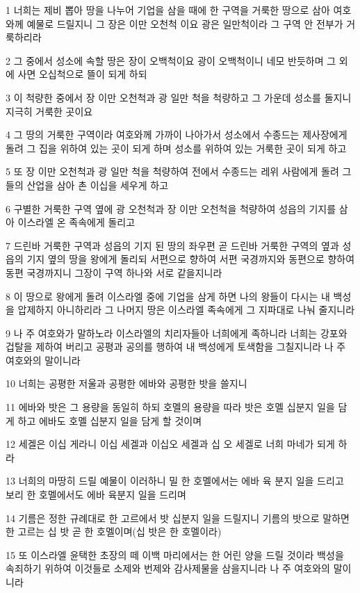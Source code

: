 \par 1 너희는 제비 뽑아 땅을 나누어 기업을 삼을 때에 한 구역을 거룩한 땅으로 삼아 여호와께 예물로 드릴지니 그 장은 이만 오천척 이요 광은 일만척이라 그 구역 안 전부가 거룩하리라
\par 2 그 중에서 성소에 속할 땅은 장이 오백척이요 광이 오백척이니 네모 반듯하며 그 외에 사면 오십척으로 뜰이 되게 하되
\par 3 이 척량한 중에서 장 이만 오천척과 광 일만 척을 척량하고 그 가운데 성소를 둘지니 지극히 거룩한 곳이요
\par 4 그 땅의 거룩한 구역이라 여호와께 가까이 나아가서 성소에서 수종드는 제사장에게 돌려 그 집을 위하여 있는 곳이 되게 하며 성소를 위하여 있는 거룩한 곳이 되게 하고
\par 5 또 장 이만 오천척과 광 일만 척을 척량하여 전에서 수종드는 레위 사람에게 돌려 그들의 산업을 삼아 촌 이십을 세우게 하고
\par 6 구별한 거룩한 구역 옆에 광 오천척과 장 이만 오천척을 척량하여 성읍의 기지를 삼아 이스라엘 온 족속에게 돌리고
\par 7 드린바 거룩한 구역과 성읍의 기지 된 땅의 좌우편 곧 드린바 거룩한 구역의 옆과 성읍의 기지 옆의 땅을 왕에게 돌리되 서편으로 향하여 서편 국경까지와 동편으로 향하여 동편 국경까지니 그장이 구역 하나와 서로 같을지니라
\par 8 이 땅으로 왕에게 돌려 이스라엘 중에 기업을 삼게 하면 나의 왕들이 다시는 내 백성을 압제하지 아니하리라 그 나머지 땅은 이스라엘 족속에게 그 지파대로 나눠 줄지니라
\par 9 나 주 여호와가 말하노라 이스라엘의 치리자들아 너희에게 족하니라 너희는 강포와 겁탈을 제하여 버리고 공평과 공의를 행하여 내 백성에게 토색함을 그칠지니라 나 주 여호와의 말이니라
\par 10 너희는 공평한 저울과 공평한 에바와 공평한 밧을 쓸지니
\par 11 에바와 밧은 그 용량을 동일히 하되 호멜의 용량을 따라 밧은 호멜 십분지 일을 담게 하고 에바도 호멜 십분지 일을 담게 할 것이며
\par 12 세겔은 이십 게라니 이십 세겔과 이십오 세겔과 십 오 세겔로 너희 마네가 되게 하라
\par 13 너희의 마땅히 드릴 예물이 이러하니 밀 한 호멜에서는 에바 육 분지 일을 드리고 보리 한 호멜에서도 에바 육분지 일을 드리며
\par 14 기름은 정한 규례대로 한 고르에서 밧 십분지 일을 드릴지니 기름의 밧으로 말하면 한 고르는 십 밧 곧 한 호멜이며(십 밧은 한 호멜이라)
\par 15 또 이스라엘 윤택한 초장의 떼 이백 마리에서는 한 어린 양을 드릴 것이라 백성을 속죄하기 위하여 이것들로 소제와 번제와 감사제물을 삼을지니라 나 주 여호와의 말이니라
